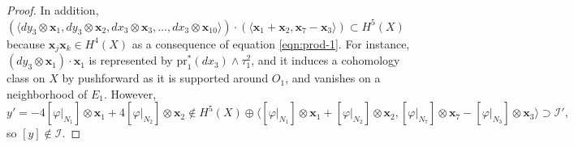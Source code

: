 \documentclass[10pt,a4paper]{amsart}
\newcommand{\la}{\langle}
\newcommand{\ra}{\rangle}
\begin{document}
\begin{proof}
In addition, 
$(\la dy_3 \otimes \mathbf{x}_1, dy_3 \otimes \mathbf{x}_2, dx_3 \otimes \mathbf{x}_3, \dots, dx_3 \otimes \mathbf{x}_{10} \ra)\cdot (\la \mathbf{x}_1+\mathbf{x}_2 ,\mathbf{x}_7-\mathbf{x}_3\ra)  \subset H^5(X)$ because
 $\mathbf{x}_j\mathbf{x}_k \in H^4(X)$ as a consequence of equation \eqref{eqn:prod-1}. For instance, $(dy_3\otimes \mathbf{x}_1) \cdot \mathbf{x}_1$ is represented by $\mathrm{pr}_1^*(dx_3) \wedge \tau_1^2$, and it induces a cohomology class on $X$ by pushforward as it is supported around $O_1$, and vanishes on a neighborhood of $E_1$. However, 
 $$
 y'=-4[\varphi|_{N_1}] \otimes \mathbf{x}_1 +4[\varphi|_{N_2}]\otimes \mathbf{x}_2 \notin H^5(X) \oplus \la [\varphi|_{N_1}]\otimes \mathbf{x}_1+[\varphi|_{N_2}]\otimes \mathbf{x}_2, [\varphi|_{N_7}]\otimes \mathbf{x}_7-[\varphi|_{N_3}]\otimes \mathbf{x}_3 \ra \supset \mathcal{I}',
 $$
 so $[y]\notin \mathcal{I}$.
\end{proof}
\end{document}
